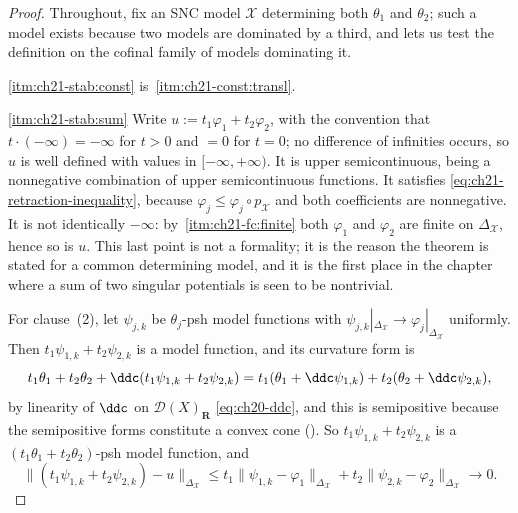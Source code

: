 \begin{proof}
Throughout, fix an SNC model \(\mathcal X\) determining both
\(\theta_1\) and \(\theta_2\); such a model exists because two models are
dominated by a third, and  lets us test
the definition on the cofinal family of models dominating it.

\cref{itm:ch21-stab:const} is
\,\cref{itm:ch21-const:transl}.

\cref{itm:ch21-stab:sum}  Write \(u:=t_1\varphi_1+t_2\varphi_2\), with the
convention that \(t\cdot(-\infty)=-\infty\) for \(t>0\) and \(=0\) for
\(t=0\); no difference of infinities occurs, so \(u\) is well defined with
values in \([-\infty,+\infty)\).  It is upper semicontinuous, being a
nonnegative combination of upper semicontinuous functions.  It satisfies
\eqref{eq:ch21-retraction-inequality}, because
\(\varphi_j\leq\varphi_j\circ p_{\mathcal X}\) and both coefficients are
nonnegative.  It is not identically \(-\infty\): by
\,\cref{itm:ch21-fc:finite} both
\(\varphi_1\) and \(\varphi_2\) are finite on \(\Delta_{\mathcal X}\),
hence so is \(u\).  This last point is not a formality; it is the
reason the theorem is stated for a common determining model, and it is the
first place in the chapter where a sum of two singular potentials is seen
to be nontrivial.

For clause~(2), let \(\psi_{j,k}\) be \(\theta_j\)-psh model functions with
\(\psi_{j,k}|_{\Delta_{\mathcal X}}\to\varphi_j|_{\Delta_{\mathcal X}}\)
uniformly.  Then \(t_1\psi_{1,k}+t_2\psi_{2,k}\) is a model function, and
its curvature form is
\[
 t_1\theta_1+t_2\theta_2
 +\ddc(t_1\psi_{1,k}+t_2\psi_{2,k})
 =t_1(\theta_1+\ddc\psi_{1,k})+t_2(\theta_2+\ddc\psi_{2,k}),
\]
by linearity of \(\ddc\) on \(\mathcal D(X)_{\mathbf R}\)
\eqref{eq:ch20-ddc}, and this is semipositive because the semipositive
forms constitute a convex cone
().  So
\(t_1\psi_{1,k}+t_2\psi_{2,k}\) is a
\((t_1\theta_1+t_2\theta_2)\)-psh model function, and
\[
 \bigl\lVert (t_1\psi_{1,k}+t_2\psi_{2,k})-u\bigr\rVert_{\Delta_{\mathcal X}}
 \leq t_1\lVert\psi_{1,k}-\varphi_1\rVert_{\Delta_{\mathcal X}}
     +t_2\lVert\psi_{2,k}-\varphi_2\rVert_{\Delta_{\mathcal X}}
 \longrightarrow0 .
\]


\end{proof}

